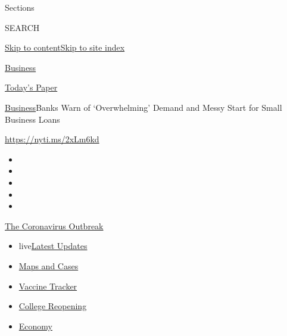 Sections

SEARCH

\protect\hyperlink{site-content}{Skip to
content}\protect\hyperlink{site-index}{Skip to site index}

\href{https://www.nytimes3xbfgragh.onion/section/business}{Business}

\href{https://myaccount.nytimes3xbfgragh.onion/auth/login?response_type=cookie\&client_id=vi}{}

\href{https://www.nytimes3xbfgragh.onion/section/todayspaper}{Today's
Paper}

\href{/section/business}{Business}\textbar{}Banks Warn of `Overwhelming'
Demand and Messy Start for Small Business Loans

\url{https://nyti.ms/2xLm6kd}

\begin{itemize}
\item
\item
\item
\item
\item
\end{itemize}

\href{https://www.nytimes3xbfgragh.onion/news-event/coronavirus?action=click\&pgtype=Article\&state=default\&region=TOP_BANNER\&context=storylines_menu}{The
Coronavirus Outbreak}

\begin{itemize}
\tightlist
\item
  live\href{https://www.nytimes3xbfgragh.onion/2020/08/04/world/coronavirus-covid-19.html?action=click\&pgtype=Article\&state=default\&region=TOP_BANNER\&context=storylines_menu}{Latest
  Updates}
\item
  \href{https://www.nytimes3xbfgragh.onion/interactive/2020/us/coronavirus-us-cases.html?action=click\&pgtype=Article\&state=default\&region=TOP_BANNER\&context=storylines_menu}{Maps
  and Cases}
\item
  \href{https://www.nytimes3xbfgragh.onion/interactive/2020/science/coronavirus-vaccine-tracker.html?action=click\&pgtype=Article\&state=default\&region=TOP_BANNER\&context=storylines_menu}{Vaccine
  Tracker}
\item
  \href{https://www.nytimes3xbfgragh.onion/2020/08/02/us/covid-college-reopening.html?action=click\&pgtype=Article\&state=default\&region=TOP_BANNER\&context=storylines_menu}{College
  Reopening}
\item
  \href{https://www.nytimes3xbfgragh.onion/live/2020/08/03/business/stock-market-today-coronavirus?action=click\&pgtype=Article\&state=default\&region=TOP_BANNER\&context=storylines_menu}{Economy}
\end{itemize}


